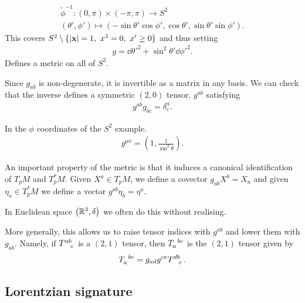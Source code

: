 \begin{examples}
\begin{enumerate}[label=\roman*)]
            \begin{align}
                \widetilde{\phi}^{-1} : \left( 0, \pi \right) \times \left( -\pi,\pi \right) \to S^2 \\
                \left( \theta', \phi' \right) \mapsto \left( - \sin \theta' \cos \phi', \cos \theta', \sin \theta' \sin \phi' \right) 
            .\end{align}
            This covers $S^2 \setminus \{\left| \vb{x} \right| = 1,~  x^{3} = 0,~  x' \geq 0\} $ and thus setting
            \begin{align}
                g = \dd{\theta}'^2 + \sin^2 \theta' \dd{\phi'}^2
            .\end{align}
            Defines a metric on all of $S^2$.
    \end{enumerate}
\end{examples}

Since $g_{ab}$ is non-degenerate, it is invertible as a matrix in any basis. We can check that the inverse defines a symmetric $\left( 2,0 \right) $ tensor, $g^{ab}$ satisfying
\begin{align}
    g^{ab} g_{bc} = \delta^{a}_c
.\end{align}

\begin{example}
    In the $\phi$ coordinates of the $S^2$ example.
    \begin{align}
        g^{\mu \nu} = \left( 1, \frac{1}{\sin^2 \theta} \right) 
    .\end{align}
\end{example}

An important property of the metric is that it induces a canonical identification of $T_p M$ and $T^{*}_p M$. Given $X^{a} \in T_p M$, we define a covector $g_{ab} X^{b} = X_{a}$ and given $\eta_a \in T_p^{*}M$ we define a vector $g^{ab} \eta_b = \eta^{a}$.

In Euclidean space $\left( \mathbb{R}^{3}, \delta \right) $ we often do this without realising.

More generally, this allows us to raise tensor indices with $g^{ab}$ and lower them with $g_{ab}$. Namely, if $\tensor{T}{^{ab}_c}$ is a $\left( 2,1 \right) $ tensor, then $\tensor{T}{_a^{bc}}$ is the $\left( 2,1 \right) $ tensor given by
\begin{align}
    \tensor{T}{_a^{bc}} = g_{ad} g^{ce} \tensor{T}{^{db}_e}
.\end{align}

\subsection{Lorentzian signature}

